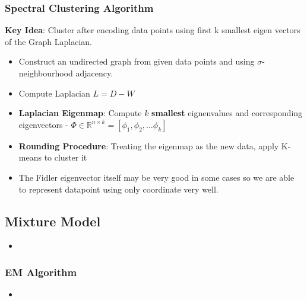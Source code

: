 \documentclass{article}
\begin{document}
\subsubsection{Spectral Clustering Algorithm}
\textbf{Key Idea}: Cluster after encoding data points using first k smallest eigen vectors of the Graph Laplacian.
\begin{itemize}
    \item Construct an undirected graph from given data points and using $\sigma$- neighbourhood adjacency.
    \item Compute Laplacian $L=D-W$
    \item \textbf{Laplacian Eigenmap}:  Compute $k$ \textbf{smallest} eignenvalues and corresponding eigenvectors - $\Phi \in \mathbb{R}^{n \times k} = [\phi_1, \phi_2, \dots \phi_k]$
    \item \textbf{Rounding Procedure}: Treating the eigenmap as the new data, apply K-means to cluster it
    \item The Fidler eigenvector itself may be very good in some cases so we are able to represent datapoint using only coordinate very well.
\end{itemize}




\subsection{Mixture Model}

\begin{itemize}
    \item {}
\end{itemize}

\subsubsection{EM Algorithm}
\begin{itemize}
    \item {}
\end{itemize}

\hrfullline
\newpage
\end{document}
